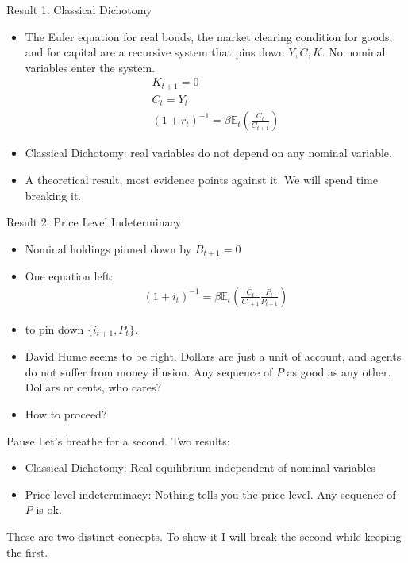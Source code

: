 \documentclass[11pt,aspectratio=169,xcolor={dvipsnames},hyperref={pdftex,pdfpagemode=UseNone,hidelinks,pdfdisplaydoctitle=true},usepdftitle=false]{beamer}
\begin{document}
\begin{frame}{Result 1: Classical Dichotomy}
\begin{itemize}
\item The Euler equation for real bonds, the market clearing condition for goods, and for capital are a recursive system that pins down $Y, C,K$. No nominal variables enter the system.
\begin{align*}
K_{t+1} = 0\\
C_t = Y_t \\
(1+r_t)^{-1} =\beta \mathbb{E}_t \left(\frac{C_t}{C_{t+1}}\right) 
\end{align*}
\item Classical Dichotomy: real variables do not depend on any nominal variable.
\item A theoretical result, most evidence points against it. We will spend time breaking it.
\end{itemize}
\end{frame}


\begin{frame}{Result 2: Price Level Indeterminacy}
\begin{itemize}
\item Nominal holdings pinned down by $B_{t+1} = 0$
\item One equation left:
\begin{align*}
(1+i_t)^{-1} = \beta \mathbb{E}_t \left(\frac{C_t}{C_{t+1}} \frac{P_t}{P_{t+1}}\right)
\end{align*}
\item to pin down  $\{i_{t+1},P_t\}$.
\item David Hume seems to be right. Dollars are just a unit of account, and agents do not suffer from money illusion. Any sequence of $P$ as good as any other. Dollars or cents, who cares?
\item How to proceed?
\end{itemize}
\end{frame}


\begin{frame}{Pause}
Let's breathe for a second. Two results:
\begin{itemize}
\item Classical Dichotomy: Real equilibrium independent of nominal variables
\item Price level indeterminacy: Nothing tells you the price level. Any sequence of $P$ is ok.
\end{itemize}
These are two distinct concepts. To show it I will break the second while keeping the first.
\end{frame}
\end{document}
